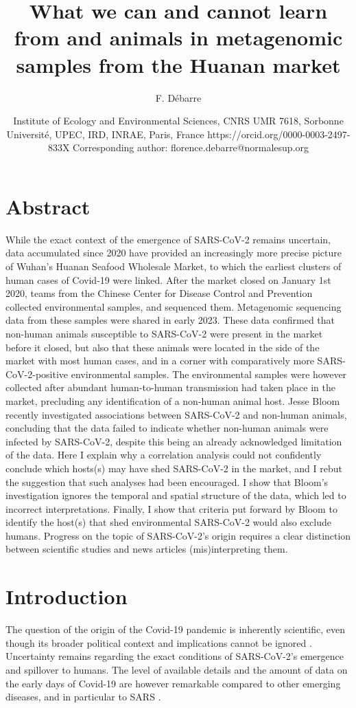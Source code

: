 \documentclass[11pt]{article}
\title{What we can and cannot learn from \sct{} and animals in metagenomic samples from the Huanan market}
\author{F. D\'ebarre}
\date{Institute of Ecology and Environmental Sciences, CNRS UMR 7618, Sorbonne Université, UPEC, IRD, INRAE, Paris, France \newline https://orcid.org/0000-0003-2497-833X \newline Corresponding author: florence.debarre@normalesup.org}
\def \sct {\mbox{SARS-CoV-2}}
\begin{document}
\maketitle



\section*{Abstract}
While the exact context of the emergence of \sct{} remains uncertain, data accumulated since 2020 have provided an increasingly more precise picture of Wuhan’s Huanan Seafood Wholesale Market, to which the earliest clusters of human cases of Covid-19 were linked. After the market closed on January 1st 2020, teams from the Chinese Center for Disease Control and Prevention collected environmental samples, and sequenced them. Metagenomic sequencing data from these samples were shared in early 2023. These data confirmed that non-human animals susceptible to \sct{} were present in the market before it closed, but also that these animals were located in the side of the market with most human cases, and in a corner with comparatively more \sct{}-positive environmental samples. The environmental samples were however collected after abundant human-to-human transmission had taken place in the market, precluding any identification of a non-human animal host. Jesse Bloom recently investigated associations between \sct{} and non-human animals, concluding that the data failed to indicate whether non-human animals were infected by \sct{}, despite this being an already acknowledged limitation of the data. Here I explain why a correlation analysis could not confidently conclude which hosts(s) may have shed \sct{} in the market, and I rebut the suggestion that such analyses had been encouraged. I show that Bloom’s investigation ignores the temporal and spatial structure of the data, which led to incorrect interpretations. Finally, I show that criteria put forward by Bloom to identify the host(s) that shed environmental \sct{} would also exclude humans. Progress on the topic of \sct{}'s origin requires a clear distinction between scientific studies and news articles (mis)interpreting them. 

\section{Introduction}

The question of the origin of the Covid-19 pandemic is inherently scientific, even though its broader political context and implications cannot be ignored \citep{GostinGronvall2023NEJM}. Uncertainty remains regarding the exact conditions of \sct{}'s emergence and spillover to humans. The level of available details and the amount of data on the early days of Covid-19 are however remarkable compared to other emerging diseases, and in particular to SARS \citep{Xu2004EID, Keusch2022PNAS}.
\end{document}

